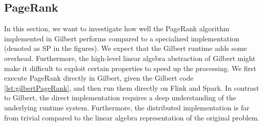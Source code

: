




\subsection{PageRank}

In this section, we want to investigate how well the PageRank algorithm~\cite{page:1999a} implemented in Gilbert performs compared to a specialized implementation (denoted as SP in the figures).
We expect that the Gilbert runtime adds some overhead.
Furthermore, the high-level linear algebra abstraction of Gilbert might make it difficult to exploit certain properties to speed up the processing.
We first execute PageRank directly in Gilbert, given the Gilbert code \cref{lst:gilbertPageRank}, and then run them directly on Flink and Spark.
In contrast to Gilbert, the direct implementation requires a deep understanding of the underlying runtime system.
Furthermore, the distributed implementation is far from trivial compared to the linear algebra representation of the original problem.

